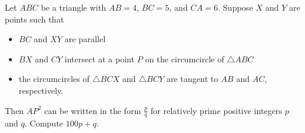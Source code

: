 Let $ABC$ be a triangle with $AB=4$, $BC=5$, and $CA=6$. Suppose $X$ and $Y$ are points such that

\begin{itemize}
	  \item $BC$ and $XY$ are parallel
	  \item $BX$ and $CY$ intersect at a point $P$ on the circumcircle of $\triangle{ABC}$
	  \item the circumcircles of $\triangle{BCX}$ and $\triangle{BCY}$ are tangent to $AB$ and $AC$, respectively.
\end{itemize}

Then $AP^2$ can be written in the form $\frac{p}{q}$ for relatively prime positive integers $p$ and $q$. Compute $100p+q$.

